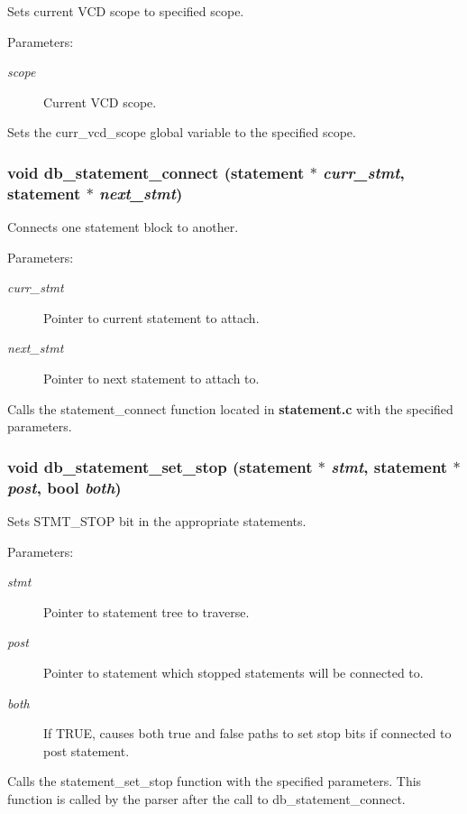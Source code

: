 Sets current VCD scope to specified scope.

\begin{Desc}
\item[Parameters: ]\par
\begin{description}
\item[{\em 
scope}]Current VCD scope.\end{description}
\end{Desc}
Sets the curr\_\-vcd\_\-scope global variable to the specified scope. 
\subsubsection{\setlength{\rightskip}{0pt plus 5cm}void db\_\-statement\_\-connect ({\bf statement} $\ast$ {\em curr\_\-stmt}, {\bf statement} $\ast$ {\em next\_\-stmt})}\label{db_8h_a10}


Connects one statement block to another.

\begin{Desc}
\item[Parameters: ]\par
\begin{description}
\item[{\em 
curr\_\-stmt}]Pointer to current statement to attach. \item[{\em 
next\_\-stmt}]Pointer to next statement to attach to.\end{description}
\end{Desc}
Calls the statement\_\-connect function located in {\bf statement.c} with the specified parameters. 
\subsubsection{\setlength{\rightskip}{0pt plus 5cm}void db\_\-statement\_\-set\_\-stop ({\bf statement} $\ast$ {\em stmt}, {\bf statement} $\ast$ {\em post}, {\bf bool} {\em both})}\label{db_8h_a11}


Sets STMT\_\-STOP bit in the appropriate statements.

\begin{Desc}
\item[Parameters: ]\par
\begin{description}
\item[{\em 
stmt}]Pointer to statement tree to traverse. \item[{\em 
post}]Pointer to statement which stopped statements will be connected to. \item[{\em 
both}]If TRUE, causes both true and false paths to set stop bits if connected to post statement.\end{description}
\end{Desc}
Calls the statement\_\-set\_\-stop function with the specified parameters. This function is called by the parser after the call to db\_\-statement\_\-connect. 

